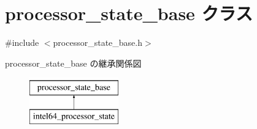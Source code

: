\hypertarget{classprocessor__state__base}{}\section{processor\+\_\+state\+\_\+base クラス}
\label{classprocessor__state__base}


{\ttfamily \#include $<$processor\+\_\+state\+\_\+base.\+h$>$}

processor\+\_\+state\+\_\+base の継承関係図\begin{figure}[H]
\begin{center}
\leavevmode
\includegraphics[height=2.000000cm]{classprocessor__state__base}
\end{center}
\end{figure}
